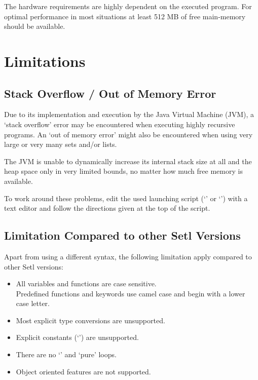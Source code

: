 The hardware requirements are highly dependent on the executed \SetlX{} program. For optimal performance in most situations at least 512 MB of free main-memory should be available.

\section{Limitations}

\subsection{Stack Overflow \slash{} Out of Memory Error}

Due to its implementation and execution by the Java Virtual Machine (JVM), a `stack overflow' error may be encountered when executing highly recursive \SetlX{} programs. An `out of memory error' might also be encountered when using very large or very many sets and\slash{}or lists.

The JVM is unable to dynamically increase its internal stack size at all and the heap space only in very limited bounds, no matter how much free memory is available.

To work around these problems, edit the used launching script (`' or `') with a text editor and follow the directions given at the top of the script.

\subsection{Limitation Compared to other Setl Versions}

Apart from using a different syntax, the following limitation apply compared to other Setl versions:

\begin{itemize}
	\item All variables and functions are case sensitive.\\
        Predefined functions and keywords use camel case and begin with a lower case letter.
    \item Most explicit type conversions are unsupported.
    \item Explicit constants (`') are unsupported.
    \item There are no `' and `pure' loops.
    \item Object oriented features are not supported.
\end{itemize}

